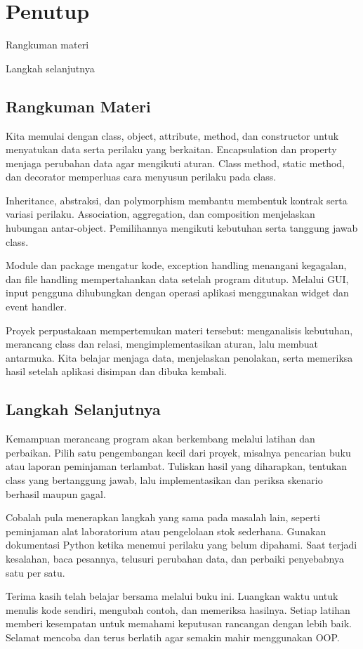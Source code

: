 \chapter{Penutup}

\begin{dibabini}
  \item Rangkuman materi
  \item Langkah selanjutnya
\end{dibabini}

\section{Rangkuman Materi}

Kita memulai dengan class, object, attribute, method, dan constructor untuk menyatukan data serta perilaku yang berkaitan. Encapsulation dan property menjaga perubahan data agar mengikuti aturan. Class method, static method, dan decorator memperluas cara menyusun perilaku pada class.

Inheritance, abstraksi, dan polymorphism membantu membentuk kontrak serta variasi perilaku. Association, aggregation, dan composition menjelaskan hubungan antar-object. Pemilihannya mengikuti kebutuhan serta tanggung jawab class.

Module dan package mengatur kode, exception handling menangani kegagalan, dan file handling mempertahankan data setelah program ditutup. Melalui GUI, input pengguna dihubungkan dengan operasi aplikasi menggunakan widget dan event handler.

Proyek perpustakaan mempertemukan materi tersebut: menganalisis kebutuhan, merancang class dan relasi, mengimplementasikan aturan, lalu membuat antarmuka. Kita belajar menjaga data, menjelaskan penolakan, serta memeriksa hasil setelah aplikasi disimpan dan dibuka kembali.

\section{Langkah Selanjutnya}

Kemampuan merancang program akan berkembang melalui latihan dan perbaikan. Pilih satu pengembangan kecil dari proyek, misalnya pencarian buku atau laporan peminjaman terlambat. Tuliskan hasil yang diharapkan, tentukan class yang bertanggung jawab, lalu implementasikan dan periksa skenario berhasil maupun gagal.

Cobalah pula menerapkan langkah yang sama pada masalah lain, seperti peminjaman alat laboratorium atau pengelolaan stok sederhana. Gunakan dokumentasi Python ketika menemui perilaku yang belum dipahami. Saat terjadi kesalahan, baca pesannya, telusuri perubahan data, dan perbaiki penyebabnya satu per satu.

\begin{tips}
Terima kasih telah belajar bersama melalui buku ini. Luangkan waktu untuk menulis kode sendiri, mengubah contoh, dan memeriksa hasilnya. Setiap latihan memberi kesempatan untuk memahami keputusan rancangan dengan lebih baik. Selamat mencoba dan terus berlatih agar semakin mahir menggunakan OOP.
\end{tips}
